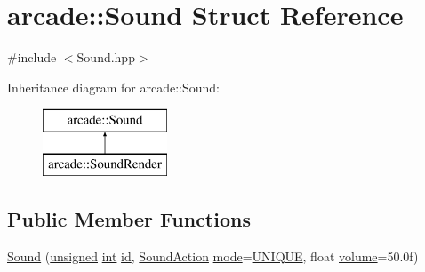 \hypertarget{structarcade_1_1_sound}{\section{arcade\-:\-:Sound Struct Reference}
\label{structarcade_1_1_sound}
}


{\ttfamily \#include $<$Sound.\-hpp$>$}

Inheritance diagram for arcade\-:\-:Sound\-:\begin{figure}[H]
\begin{center}
\leavevmode
\includegraphics[height=2.000000cm]{structarcade_1_1_sound}
\end{center}
\end{figure}
\subsection*{Public Member Functions}
\begin{DoxyCompactItemize}
\item 
\hyperlink{structarcade_1_1_sound_a52388728d9750d6f9aee13b19b4b8427}{Sound} (\hyperlink{curses_8priv_8h_aca40206900cfc164654362fa8d4ad1e6}{unsigned} \hyperlink{term__entry_8h_ad65b480f8c8270356b45a9890f6499ae}{int} \hyperlink{structarcade_1_1_sound_a9bee48a44860d44ddb963621ceb9172b}{id}, \hyperlink{namespacearcade_a31ef30225775697d1aeaf59819ac5051}{Sound\-Action} \hyperlink{structarcade_1_1_sound_a67fc0884cb4d9445ad6c9d9a241a15ef}{mode}=\hyperlink{namespacearcade_a31ef30225775697d1aeaf59819ac5051a0dcacdf4484296a70e9bb6fabe7e3b8a}{U\-N\-I\-Q\-U\-E}, float \hyperlink{structarcade_1_1_sound_aa80e8832313b76cefcf2e866c4a2e1cc}{volume}=50.\-0f)
\end{DoxyCompactItemize}
